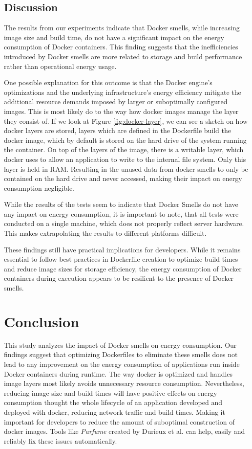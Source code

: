 \documentclass[conference]{IEEEtran}
\begin{document}
\subsection{Discussion}
The results from our experiments indicate that Docker smells, while increasing image size and build time, do not have a significant impact on the energy consumption of Docker containers. This finding suggests that the inefficiencies introduced by Docker smells are more related to storage and build performance rather than operational energy usage.

One possible explanation for this outcome is that the Docker engine's optimizations and the underlying infrastructure's energy efficiency mitigate the additional resource demands imposed by larger or suboptimally configured images. This is most likely do to the way how docker images manage the layer they consist of. If we look at Figure \ref{fig:docker-layer}, we can see a sketch on how docker layers are stored, layers which are defined in the Dockerfile build the docker image, which by default is stored on the hard drive of the system running the container. On top of the layers of the image, there is a writable layer, which docker uses to allow an application to write to the internal file system. Only this layer is held in RAM. Resulting in the unused data from docker smells to only be contained on the hard drive and never accessed, making their impact on energy consumption negligible.

While the results of the tests seem to indicate that Docker Smells do not have any impact on energy consumption, it is important to note, that all tests were conducted on a single machine, which does not properly reflect server hardware. This makes extrapolating the results to different platforms difficult.

These findings still have practical implications for developers. While it remains essential to follow best practices in Dockerfile creation to optimize build times and reduce image sizes for storage efficiency, the energy consumption of Docker containers during execution appears to be resilient to the presence of Docker smells.


\section{Conclusion}
This study analyzes the impact of Docker smells on energy consumption. Our findings suggest that optimizing Dockerfiles to eliminate these smells does not lead to any improvement on the energy consumption of applications run inside Docker containers during runtime. The way docker is optimized and handles image layers most likely avoids unnecessary resource consumption. Nevertheless, reducing image size and build times will have positive effects on energy consumption thought the whole lifecycle of an application developed and deployed with docker, reducing network traffic and build times. Making it important for developers to reduce the amount of suboptimal construction of docker images. Tools like \textit{Parfume} created by Durieux et al. \cite{durieux2023parfumdetectionautomaticrepair} can help, easily and reliably fix these issues automatically.
\end{document}
